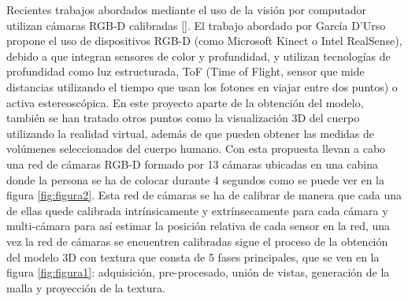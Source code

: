 Recientes trabajos abordados mediante el uso de la visión por computador utilizan cámaras RGB-D calibradas [\cite{Nahuel1}]. El trabajo abordado por García D'Urso propone el uso de dispositivos RGB-D (como Microsoft Kinect o Intel RealSense), debido a que integran sensores de color y profundidad, y utilizan tecnologías de profundidad como luz estructurada, ToF (Time of Flight, sensor que mide distancias utilizando el tiempo que usan los fotones en viajar entre dos puntos) o activa estereoscópica. En este proyecto aparte de la obtención del modelo, también se han tratado otros puntos como la visualización 3D del cuerpo utilizando la realidad virtual, además de que pueden obtener las medidas de volúmenes seleccionados del cuerpo humano. Con esta propuesta llevan a cabo una red de cámaras RGB-D formado por 13 cámaras ubicadas en una cabina donde la persona se ha de colocar durante 4 segundos como se puede ver en la figura \ref{fig:figura2}. Esta red de cámaras se ha de calibrar de manera que cada una de ellas quede calibrada intrínsicamente y extrínsecamente para cada cámara y multi-cámara para así estimar la posición relativa de cada sensor en la red, una vez la red de cámaras se encuentren calibradas sigue el proceso de la obtención del modelo 3D con textura que consta de 5 fases principales, que se ven en la figura \ref{fig:figura1}: adquisición, pre-procesado, unión de vistas, generación de la malla y proyección de la textura.
